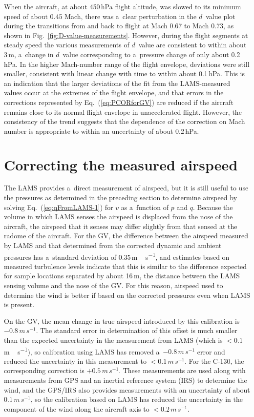 \documentclass[amtd, online, hvmath]{copernicus}
\begin{document}
When the aircraft, at about 450\,hPa flight altitude, was slowed to
its minimum speed of about 0.45 Mach, there was a~clear perturbation
in the $d$~value plot during the transitions from and back to flight
at Mach 0.67 to Mach 0.73, as shown in
Fig.~\ref{fig:D-value-measurements}.  However, during the flight
segments at steady speed the various measurements of $d$~value are
consistent to within about 3\,m, a~change in $d$~value corresponding
to a~pressure change of only about 0.2\,hPa. In the higher Mach-number
range of the flight envelope, deviations were still smaller,
consistent with linear change with time to within about 0.1\,hPa.
This is an indication that the larger deviations of the fit from the
LAMS-measured values occur at the extremes of the flight envelope, and
that errors in the corrections represented by Eq.~(\ref{eq:PCORforGV})
are reduced if the aircraft remains close to its normal flight
envelope in unaccelerated flight. However, the consistency of the
trend suggests that the dependence of the correction on Mach number is
appropriate to within an uncertainty of about 0.2\,hPa.

\section{Correcting the measured airspeed}

The LAMS provides a~direct measurement of airspeed, but it is still
useful to use the pressures as determined in the preceding section to
determine airspeed by solving Eq.~(\ref{eq:qFromLAMS-1}) for $v$ as
a~function of $p$ and $q$. Because the volume in which LAMS senses the
airspeed is displaced from the nose of the aircraft, the airspeed that
it senses may differ slightly from that sensed at the radome of the
aircraft. For the GV, the difference between the airspeed measured by
LAMS and that determined from the corrected dynamic and ambient
pressures has a~standard deviation of 0.35\,\unit{m\,s^{-1}}, and
estimates based on measured turbulence levels indicate that this is
similar to the difference expected for sample locations separated by
about 16\,\unit{m}, the distance between the LAMS sensing volume and
the nose of the GV. For this reason, airspeed used to determine the
wind is better if based on the corrected pressures even when LAMS is
present.

On the GV, the mean change in true airspeed introduced by this
calibration is $-0.8\,\unit{m\,s^{-1}}$. The standard error in
determination of this offset is much smaller than the expected
uncertainty in the measurement from LAMS (which is
$<0.1$\,\unit{m\,s^{-1}}), so calibration using LAMS has removed
a~$-0.8\,\unit{m\,s^{-1}}$ error and reduced the uncertainty in this
measurement to $<0.1\,\unit{m\,s^{-1}}$.  For the C-130, the
corresponding correction is $+0.5\,\unit{m\,s^{-1}}$.  These
measurements are used along with measurements from GPS and an inertial
reference system (IRS) to determine the wind, and the GPS/IRS also
provides measurements with an uncertainty of about
$0.1\,\unit{m\,s^{-1}}$, so the calibration based on LAMS has reduced
the uncertainty in the component of the wind along the aircraft axis
to $<0.2\,\unit{m\,s^{-1}}$.
\end{document}
